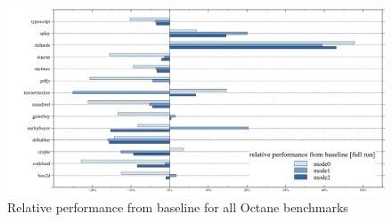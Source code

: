 \begin{figure}[ht]
  \begin{center}
    \centering
    \includegraphics[width=1.0\textwidth]{figures/octane_variation.png}
    \caption{Relative performance from baseline for all Octane benchmarks}
    \label{f:octane_variation}
  \end{center}
\end{figure}


%
%
%
%




